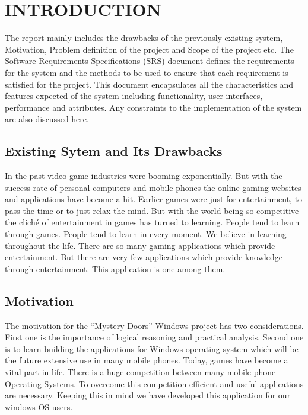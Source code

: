 \chapter{INTRODUCTION}
  The report mainly  includes  the  drawbacks  of  the  previously  existing  system, Motivation, Problem  definition  of  the  project  and Scope of  the  project  etc. The Software Requirements Specifications (SRS) document defines the requirements for the system and the methods to be used to ensure that each requirement is satisfied for the project. This document encapsulates all  the  characteristics  and  features  expected  of  the  system  including  functionality,  user interfaces, performance and attributes. Any constraints to the implementation of the system are also discussed here. 

\section{Existing Sytem and Its Drawbacks}
\hspace{1cm}In the past video game industries were booming exponentially. But with the success rate of personal computers and mobile phones the online gaming websites and applications have become a hit. Earlier games were just for entertainment, to pass the time or to just relax the mind. But with the world being so competitive the cliché of entertainment in games has turned to learning. People tend to learn through games. People tend to learn in every moment. We believe in learning throughout the life. There are so many gaming applications which provide entertainment. But there are very few applications which provide knowledge through entertainment. This application is one among them.

 
\section{Motivation}
\hspace{1cm}The motivation for the “Mystery Doors” Windows project has two considerations. First one is the importance of logical reasoning and practical analysis. Second one  is  to  learn  building  the  applications  for  Windows  operating  system  which  will  be  the future extensive use in many mobile phones. Today, games have become a vital part in life. There is a huge competition between many mobile phone Operating Systems. To overcome this competition efficient and useful applications are necessary. Keeping this in mind we have developed this application for our windows OS users.\\


